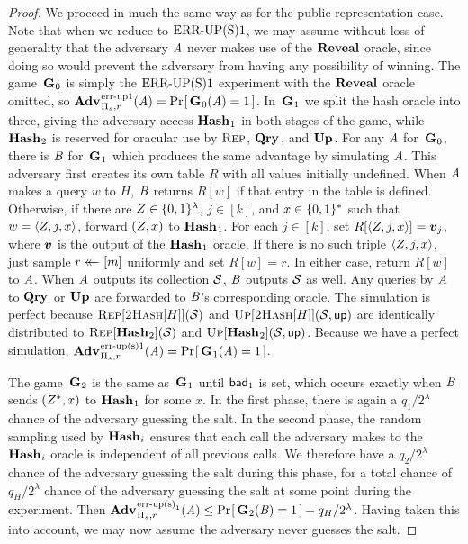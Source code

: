 \begin{proof} We proceed in much the same way as for the public-representation case. Note that when we reduce to $\textnormal{ERR\mbox{-}UP(S)}1$, we may assume without loss of generality that the adversary $\mathit{A}$ never makes use of the $\mathbf{Reveal}$ oracle, since doing so would prevent the adversary from having any possibility of winning. The game~$\mathbf{G}\hspace{0.5pt}_0$ is simply the $\textnormal{ERR\mbox{-}UP(S)}1$ experiment with the $\mathbf{Reveal}$ oracle omitted, so $\Adv{\errep1}_{\struct_s,r}(\advA) = \Prob{\G_0(\advA) = 1}$. In~$\mathbf{G}\hspace{0.5pt}_1$ we split the hash oracle into three, giving the adversary access $\mathbf{Hash}\hspace{0.5pt}_1$ in both stages of the game, while $\mathbf{Hash}\hspace{0.5pt}_2$ is reserved for oracular use by $\textsc{Rep}$, $\mathbf{Qry}\hspace{0.5pt}$, and $\mathbf{Up}\hspace{0.5pt}$. For any $\mathit{A}$ for~$\mathbf{G}\hspace{0.5pt}_0$, there is $\mathit{B}$ for~$\mathbf{G}\hspace{0.5pt}_1$ which produces the same advantage by simulating $\mathit{A}$. This adversary first creates its own table $R$ with all values initially undefined. When $\mathit{A}$ makes a query $w$ to $H$, $\mathit{B}$ returns $R[w]$ if that entry in the table is defined. Otherwise, if there are $Z \in \{0,1\}^\lambda$, $j \in [k]$, and $x \in \{0,1\}^*$ such that $w = \langle Z, j, x\rangle$, forward $(Z,x)$ to $\mathbf{Hash}\hspace{0.5pt}_1$. For each $j \in [k]$, set $R[\langle\salt, j, x\rangle] = \vv_j$, where $\vv$ is the output of the $\mathbf{Hash}\hspace{0.5pt}_1$ oracle. If there is no such triple $\langle Z, j, x\rangle$, just sample $r \mathrel{\leftarrow\mkern-14mu\leftarrow} [m]$ uniformly and set $R[w] = r$. In either case, return $R[w]$ to $\mathit{A}$. When $\mathit{A}$ outputs its collection $\mathcal{S}$, $\mathit{B}$ outputs $\mathcal{S}$ as well. Any queries by $\mathit{A}$ to $\mathbf{Qry}\hspace{0.5pt}$ or $\mathbf{Up}\hspace{0.5pt}$ are forwarded to $\mathit{B}$'s corresponding oracle. The simulation is perfect because $\textsc{Rep}[\textsc{2Hash}[H]](\mathcal{S})$ and $\textsc{Up}[\textsc{2Hash}[H]](\mathcal{S},\mathsf{up})$ are identically distributed to $\textsc{Rep}[\mathbf{Hash}\hspace{0.5pt}_2](\mathcal{S})$ and $\textsc{Up}[\mathbf{Hash}\hspace{0.5pt}_2](\mathcal{S},\mathsf{up})$. Because we have a perfect simulation, $\Adv{\erreps1}_{\struct_s,r}(\advA) = \Prob{\G_1(\advA) = 1}$.

The game~$\mathbf{G}\hspace{0.5pt}_2$ is the same as~$\mathbf{G}\hspace{0.5pt}_1$ until $\mathsf{bad}_1$ is set, which occurs exactly when $\mathit{B}$ sends $(Z^*,x)$ to $\mathbf{Hash}\hspace{0.5pt}_1$ for some $x$. In the first phase, there is again a $q_1/2^\lambda$ chance of the adversary guessing the salt. In the second phase, the random sampling used by $\mathbf{Hash}\hspace{0.5pt}_i$ ensures that each call the adversary makes to the $\mathbf{Hash}\hspace{0.5pt}_i$ oracle is independent of all previous calls. We therefore have a $q_2/2^\lambda$ chance of the adversary guessing the salt during this phase, for a total chance of $q_H/2^\lambda$ chance of the adversary guessing the salt at some point during the experiment. Then $\Adv{\erreps_1}_{\struct_s,r}(\advA) \le \Prob{\G_2(\advB) = 1} + q_H/2^\lambda$. Having taken this into account, we may now assume the adversary never guesses the salt.


\end{proof}
